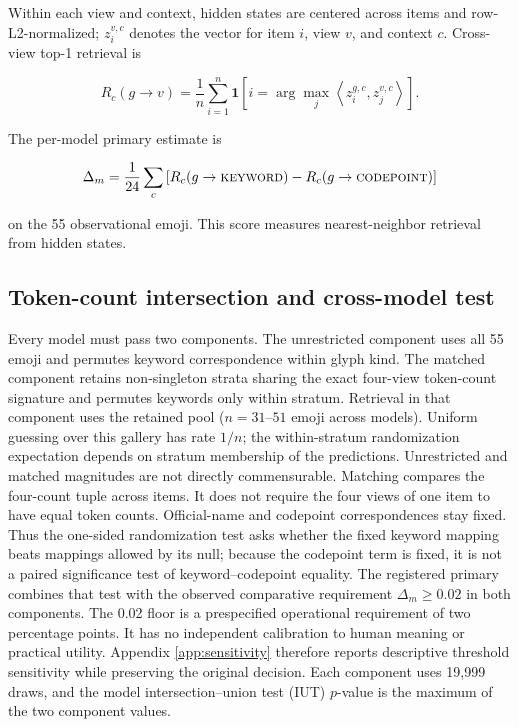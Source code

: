 \documentclass{article}
\newcommand{\codepoint}{\textsc{codepoint}}
\newcommand{\alias}{\textsc{keyword}}
\begin{document}
Within each view and context, hidden states are centered across items and
row-L2-normalized; $z^{v,c}_i$ denotes the vector for item $i$, view $v$, and
context $c$. Cross-view top-1 retrieval is

\begin{equation}
  R_c(g \rightarrow v) = \frac{1}{n}\sum_{i=1}^{n}
  \mathbf{1}\left[i = \arg\max_j
  \left\langle z^{g,c}_i, z^{v,c}_j \right\rangle\right].
  \label{eq:retrieval}
\end{equation}

The per-model primary estimate is

\begin{equation}
  \Delta_m = \frac{1}{24}\sum_c
  \left[R_c(g \rightarrow \alias) -
  R_c(g \rightarrow \codepoint)\right]
  \label{eq:primary}
\end{equation}

on the 55 observational emoji. This score measures nearest-neighbor retrieval
from hidden states.

\subsection{Token-count intersection and cross-model test}

Every model must pass two components. The unrestricted component uses all 55
emoji and permutes keyword correspondence within glyph kind. The matched
component retains non-singleton strata sharing the exact four-view
token-count signature and permutes keywords only within stratum. Retrieval in
that component uses the retained pool ($n=31$--$51$ emoji across models).
Uniform guessing over this gallery has rate $1/n$; the within-stratum
randomization expectation depends on stratum membership of the predictions.
Unrestricted and matched magnitudes are not directly commensurable.
Matching compares the four-count tuple across items. It does not require the
four views of one item to have equal token counts.
Official-name and codepoint correspondences stay fixed.
Thus the one-sided randomization test asks whether the fixed keyword mapping
beats mappings allowed by its null; because the codepoint term is fixed, it is
not a paired significance test of keyword--codepoint equality. The registered
primary combines that test with the observed comparative requirement
$\Delta_m\geq0.02$ in both components.
The 0.02 floor is a prespecified operational requirement of two percentage
points. It has no independent calibration to human meaning or practical
utility. Appendix \ref{app:sensitivity} therefore reports descriptive
threshold sensitivity while preserving the original decision.
Each component uses 19,999 draws, and the model intersection--union test
(IUT) $p$-value is the maximum of the two component values.
\end{document}
